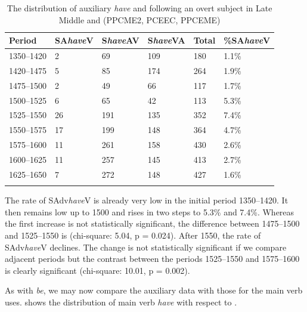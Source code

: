 \documentclass[output=paper]{langsci/langscibook}
\begin{document}
\begin{table}[htbp]
\caption{The distribution of auxiliary \emph{have} and  following an
overt subject in Late Middle and  (PPCME2, PCEEC,
PPCEME)}
\label{tab:key:09.4}
\begin{tabularx}{\textwidth}{lXXXXX}
\lsptoprule
\textbf{Period} & \textbf{SA\emph{have}V} & \textbf{S\emph{have}AV} & \textbf{S\emph{have}VA} & \textbf{Total} & \textbf{\%SA\emph{have}V}\\
\midrule
1350--1420 & 2 & 69 & 109 & 180 & 1.1\%\\
1420--1475 & 5 & 85 & 174 & 264 & 1.9\%\\
1475--1500 & 2 & 49 & 66 & 117 & 1.7\%\\
1500--1525 & 6 & 65 & 42 & 113 & 5.3\%\\
1525--1550 & 26 & 191 & 135 & 352 & 7.4\%\\
1550--1575 & 17 & 199 & 148 & 364 & 4.7\%\\
1575--1600 & 11 & 261 & 158 & 430 & 2.6\%\\
1600--1625 & 11 & 257 & 145 & 413 & 2.7\%\\
1625--1650 & 7 & 272 & 148 & 427 & 1.6\%\\
\lspbottomrule
\end{tabularx}
\end{table}

The rate of SAdv\emph{have}V is already very low in the initial period
1350--1420. It then remains low up to 1500 and rises in two steps to 5.3\% and
7.4\%. Whereas the first increase is not statistically significant, the
difference between 1475--1500 and 1525--1550 is (chi-square: 5.04, p = 0.024).
After 1550, the rate of SAdv\emph{have}V declines. The change is not
statistically significant if we compare adjacent periods but the contrast
between the periods 1525--1550 and 1575--1600 is clearly significant
(chi-square: 10.01, p = 0.002).

As with \emph{be}, we may now compare the auxiliary data with those for the
main verb uses.  shows the distribution of main verb
\emph{have} with respect to .
\end{document}
